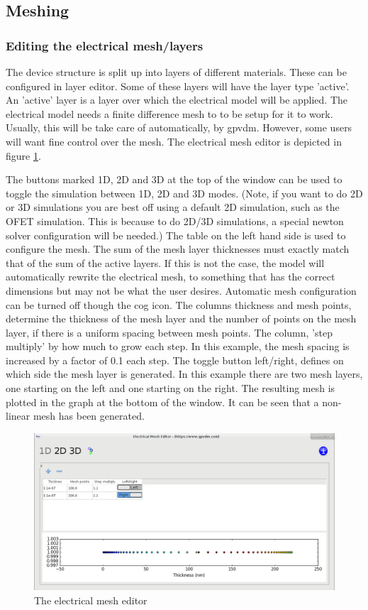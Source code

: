 \documentclass[11pt]{article}
\begin{document}
\subsection{Meshing}
\subsubsection{Editing the electrical mesh/layers}
The device structure is split up into layers of different materials.  These can be configured in layer editor.  Some of these layers will have the layer type 'active'.  An 'active' layer is a layer over which the electrical model will be applied.  The electrical model needs a finite difference mesh to to be setup for it to work.  Usually, this will be take care of automatically, by gpvdm.  However, some users will want fine control over the mesh.  The electrical mesh editor is depicted in figure \ref{fig:emesh}.


The buttons marked 1D, 2D and 3D at the top of the window can be used to toggle the simulation between 1D, 2D and 3D modes.  (Note, if you want to do 2D or 3D simulations you are best off using a default 2D simulation, such as the OFET simulation.  This is because to do 2D/3D simulations, a special newton solver configuration will be needed.) The table on the left hand side is used to configure the mesh.  The sum of the mesh layer thicknesses must exactly match that of the sum of the active layers.  If this is not the case, the model will automatically rewrite the electrical mesh, to something that has the correct dimensions but may not be what the user desires.  Automatic mesh configuration can be turned off though the cog icon.  The columns thickness and mesh points, determine the thickness of the mesh layer and the number of points on the mesh layer, if there is a uniform spacing between mesh points.  The column, 'step multiply' by how much to grow each step.  In this example, the mesh spacing is increased by a factor of 0.1 each step.  The toggle button left/right, defines on which side the mesh layer is generated.  In this example there are two mesh layers, one starting on the left and one starting on the right.  The resulting mesh is plotted in the graph at the bottom of the window.  It can be seen that a non-linear mesh has been generated.

\begin{figure}[ht!]
\centering
\includegraphics[width=140mm]{./images/emesh.png}
\caption{The electrical mesh editor}
\label{fig:emesh}
\end{figure}
\end{document}
